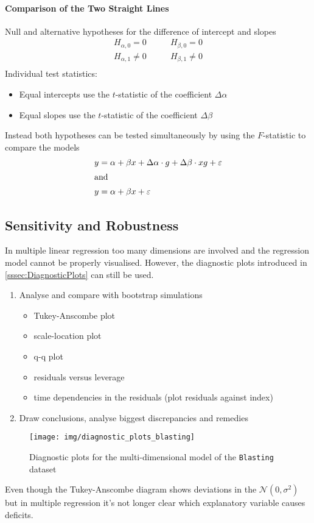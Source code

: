\documentclass[11pt]{article}
\theoremstyle{definition}
\newcommand*\N[1]{\mathcal{N}\left(#1\right)}
\begin{document}
\paragraph{Comparison of the Two Straight Lines} Null and alternative hypotheses for the difference of intercept and slopes
\begin{align*}
	H_{\alpha,0} = 0 &\qquad H_{\beta,0} = 0\\
	H_{\alpha,1} \neq 0 &\qquad H_{\beta,1} \neq 0\\
\end{align*}
Individual test statistics:
\begin{itemize}[nosep]
	\item Equal intercepts use the $t$-statistic of the coefficient $\Delta\alpha$
	\item Equal slopes use the $t$-statistic of the coefficient $\Delta\beta$
\end{itemize}
Instead both hypotheses can be tested simultaneously by using the $F$-statistic to compare the models
\begin{align}
	y &= \alpha + \beta x + \Delta\alpha\cdot g + \Delta\beta\cdot x g + \varepsilon\\
	\intertext{and}
	y &= \alpha + \beta x + \varepsilon
\end{align}

\subsection{Sensitivity and Robustness}
In multiple linear regression too many dimensions are involved and the regression model cannot be properly visualised. However, the diagnostic plots introduced in \ref{sssec:DiagnosticPlots} can still be used.
\begin{enumerate}
	\item Analyse and compare with bootstrap simulations
	\begin{itemize}
		\item Tukey-Anscombe plot
		\item scale-location plot
		\item q-q plot
		\item residuals versus leverage
		\item time dependencies in the residuals (plot residuals against index)
	\end{itemize}
	\item Draw conclusions, analyse biggest discrepancies and remedies
\end{enumerate}
\begin{figure}[H]
	\centering
	\texttt{[image: img/diagnostic\_plots\_blasting]}
	\caption{Diagnostic plots for the multi-dimensional model of the \texttt{Blasting} dataset}
	\label{fig:diagnosticplotsblasting}
\end{figure}
Even though the Tukey-Anscombe diagram shows deviations in the $\N{0,\sigma^2}$ but in multiple regression it's not longer clear which explanatory variable causes deficits.
\end{document}

